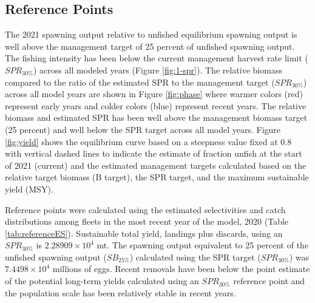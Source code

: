 \documentclass[11pt,
  english,
  a4paper,
]{article}
\begin{document}
\leavevmode\tagmcend\tagstructend


\hypertarget{reference-points-1}{%
\subsection{Reference Points}\label{reference-points-1}}

\leavevmode\tagmcend\tagstructend


The 2021 spawning output relative to unfished equilibrium spawning output is well above the management target of 25 percent of unfished spawning output. The fishing intensity has been below the current management harvest rate limit ({\(SPR_{30\%}\)\leavevmode\tagmcend\tagstructend}) across all modeled years (Figure \ref{fig:1-spr}). The relative biomass compared to the ratio of the estimated SPR to the management target ({\(SPR_{30\%}\)\leavevmode\tagmcend\tagstructend}) across all model years are shown in Figure \ref{fig:phase} where warmer colors (red) represent early years and colder colors (blue) represent recent years. The relative biomass and estimated SPR has been well above the management biomass target (25 percent) and well below the SPR target across all model years. Figure \ref{fig:yield} shows the equilibrium curve based on a steepness value fixed at 0.8 with vertical dashed lines to indicate the estimate of fraction unfish at the start of 2021 (current) and the estimated management targets calculated based on the relative target biomass (B target), the SPR target, and the maximum sustainable yield (MSY).

\leavevmode\tagmcend\tagstructend\par


Reference points were calculated using the estimated selectivities and catch distributions among fleets in the most recent year of the model, 2020 (Table \ref{tab:referenceES}). Sustainable total yield, landings plus discards, using an {\(SPR_{30\%}\)\leavevmode\tagmcend\tagstructend} is \ensuremath{2.28909\times 10^{4}} mt. The spawning output equivalent to 25 percent of the unfished spawning output ({\(SB_{25\%}\)\leavevmode\tagmcend\tagstructend}) calculated using the SPR target ({\(SPR_{30\%}\)\leavevmode\tagmcend\tagstructend}) was \ensuremath{7.4498\times 10^{4}} millions of eggs. Recent removals have been below the point estimate of the potential long-term yields calculated using an {\(SPR_{30\%}\)\leavevmode\tagmcend\tagstructend} reference point and the population scale has been relatively stable in recent years.
\end{document}
